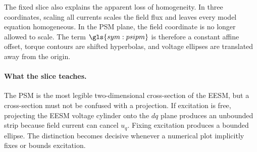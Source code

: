 

The fixed slice also explains the apparent loss of homogeneity. In three
coordinates, scaling all currents scales the field flux and leaves every model
equation homogeneous. In the PSM plane, the field coordinate is no longer
allowed to scale. The term \(\gls{sym:psipm}\) is therefore a constant affine
offset, torque contours are shifted hyperbolas, and voltage ellipses are
translated away from the origin.

\paragraph{What the slice teaches.}
The PSM is the most legible two-dimensional cross-section of the EESM, but a
cross-section must not be confused with a projection. If excitation is free,
projecting the EESM voltage cylinder onto the \(dq\) plane produces an
unbounded strip because field current can cancel \(u_q\). Fixing excitation
produces a bounded ellipse. The distinction becomes decisive whenever a
numerical plot implicitly fixes or bounds excitation.
